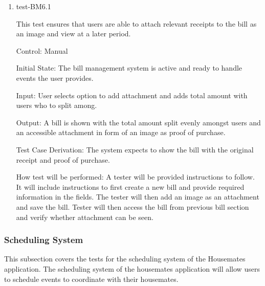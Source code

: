\documentclass[12pt, titlepage]{article}
\begin{document}
\begin{enumerate}
\item{test-BM6.1\\}

This test ensures that users are able to attach relevant receipts to the bill as an image and view at a later period.

Control: Manual
					
Initial State: The bill management system is active and ready to handle events the user provides.
					
Input: User selects option to add attachment and adds total amount with users who to split among.
					
Output: A bill is shown with the total amount split evenly amongst users and an accessible attachment in form of an image as proof of purchase.

Test Case Derivation: The system expects to show the bill with the original receipt and proof of purchase.

How test will be performed: A tester will be provided instructions to follow. It will include instructions to first create a new bill and provide required information in the fields. The tester will then add an image as an attachment and save the bill. Tester will then access the bill from previous bill section and verify whether attachment can be seen. 

\end{enumerate}

\subsubsection{Scheduling  System}

This subsection covers the tests for the scheduling system of the Housemates application. The scheduling system of the housemates application will allow users to schedule events to coordinate with their housemates.
\end{document}
